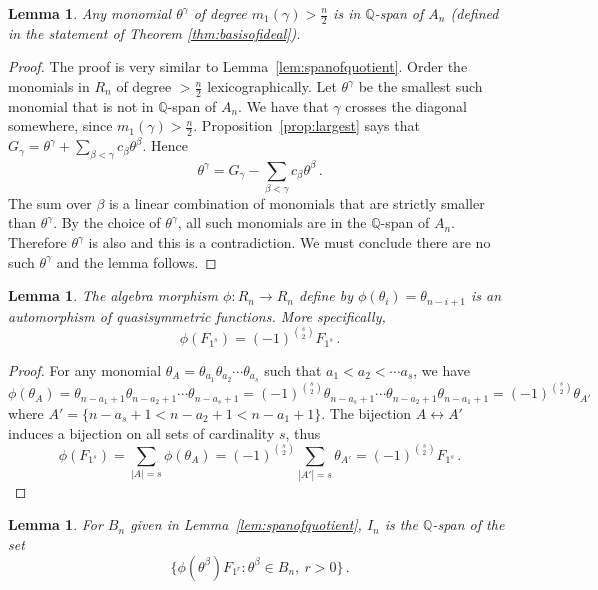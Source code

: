 \documentclass[11pt]{amsart}
\newtheorem{lemma}[theorem]{Lemma}
\theoremstyle{definition}
\numberwithin{equation}{section}
\begin{document}
\begin{lemma}\label{lem:degree}
Any monomial $\theta^\gamma$ of degree $m_1(\gamma)>\frac{n}{2}$ is in  $\mathbb Q$-span of
$A_n$ (defined in the statement of Theorem \ref{thm:basisofideal}).
\end{lemma}

\begin{proof} The proof is very similar  to Lemma~\ref{lem:spanofquotient}.
Order the monomials in $R_n$ of degree $>\frac{n}{2}$ lexicographically.
Let  $\theta^\gamma$ be the smallest such monomial that is not in $\mathbb Q$-span of $A_n$.
We have  that $\gamma$ crosses the  diagonal somewhere, since $m_1(\gamma)>\frac{n}{2}$.
Proposition~\ref{prop:largest} says that
$G_\gamma = \theta^\gamma + \sum_{\beta<\gamma}  c_\beta \theta^\beta$. Hence
$$ \theta^\gamma = G_\gamma  - \sum_{\beta<\gamma} c_\beta \theta^\beta\,.$$
The sum over $\beta$ is a linear combination of monomials that are
strictly smaller than $\theta^\gamma$. By the choice of $\theta^\gamma$,
all such monomials are in the $\mathbb Q$-span of $A_n$.
Therefore $\theta^\gamma$ is also and this is a contradiction.
We must conclude there are no such $\theta^\gamma$ and the lemma follows.
\end{proof}


\begin{lemma}\label{lem:automorphism}
The algebra morphism $\phi\colon R_n\to R_n$ define by $\phi(\theta_i)=\theta_{n-i+1}$
is an automorphism of quasisymmetric functions. More specifically,
\begin{equation}\label{eq:autoquasi}
\phi(F_{1^s})=(-1)^{s \choose 2} F_{1^s}\,.
\end{equation}
\end{lemma}

\begin{proof}
For any monomial $\theta_A = \theta_{a_1}\theta_{a_2}\cdots \theta_{a_s}$ such that $a_1<a_2<\cdots a_s$, we have
$$\phi(\theta_A) =  \theta_{n-a_1+1}\theta_{n-a_2+1}\cdots \theta_{n-a_s+1}
= (-1)^{s \choose 2}  \theta_{n-a_s+1}\cdots\theta_{n-a_{2}+1} \theta_{n-a_1+1}
= (-1)^{s \choose 2} \theta_{A'}$$
where $A'=\big\{ n-a_s+1< n-a_{2}+1<n-a_1+1\big\}$.
The bijection $A\leftrightarrow A'$ induces a bijection on all sets of cardinality $s$, thus
$$\phi(F_{1^s})= \sum_{|A|=s} \phi(\theta_A) =  (-1)^{s \choose 2} \sum_{|A'|=s} \theta_{A'}=(-1)^{s \choose 2} F_{1^s}\,.$$
\vskip-18pt \end{proof}

\begin{lemma}\label{lem:idealpres}
For $B_n$ given in Lemma~\ref{lem:spanofquotient}, $I_n$ is the ${\mathbb Q}$-span of the set
\begin{equation}\label{eq:autoquasi}
\big\{ \phi(\theta^\beta) F_{1^r} : \theta^\beta \in B_n,\ r>0\big\}\,.
\end{equation}
\end{lemma}
\end{document}

